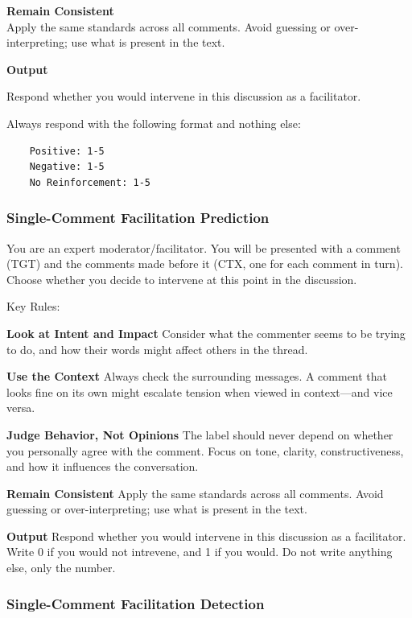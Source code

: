 \documentclass[11pt]{article}
\theoremstyle{definition}
\theoremstyle{plain}
\begin{document}
\textbf{Remain Consistent} \\
Apply the same standards across all comments. Avoid guessing or over-interpreting; use what is present in the text.

\textbf{Output}

Respond whether you would intervene in this discussion as a facilitator.

Always respond with the following format and nothing else:

\begin{verbatim}
	Positive: 1-5
	Negative: 1-5
	No Reinforcement: 1-5
\end{verbatim}


\subsubsection{Single-Comment Facilitation Prediction}
\label{app:guidelines:llm:timing-prediction}

You are an expert moderator/facilitator.
You will be presented with a comment (TGT) and the comments made before it (CTX, one for each comment in turn).
Choose whether you decide to intervene at this point in the discussion.


Key Rules:

\textbf{Look at Intent and Impact}
Consider what the commenter seems to be trying to do, and how their words might affect others in the thread.

\textbf{Use the Context}
Always check the surrounding messages. A comment that looks fine on its own might escalate tension when viewed in context—and vice versa.

\textbf{Judge Behavior, Not Opinions}
The label should never depend on whether you personally agree with the comment. Focus on tone, clarity, constructiveness, and how it influences the conversation.

\textbf{Remain Consistent}
Apply the same standards across all comments. Avoid guessing or over-interpreting; use what is present in the text.

\textbf{Output}
Respond whether you would intervene in this discussion as a facilitator. Write 0 if you would not intrevene, and 1 if you would. Do not write anything else, only the number.


\subsubsection{Single-Comment Facilitation Detection}
\label{app:guidelines:llm:timing-detection}
\end{document}
